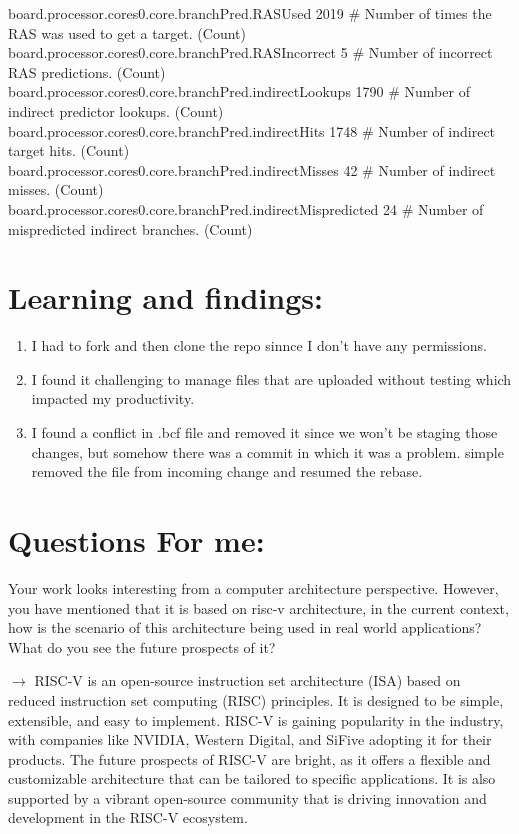 board.processor.cores0.core.branchPred.RASUsed         2019 \# Number of times the RAS was used to get a target. (Count)\\
board.processor.cores0.core.branchPred.RASIncorrect     5 \# Number of incorrect RAS predictions. (Count)\\
board.processor.cores0.core.branchPred.indirectLookups  1790 \# Number of indirect predictor lookups. (Count)\\
board.processor.cores0.core.branchPred.indirectHits     1748 \# Number of indirect target hits. (Count)\\
board.processor.cores0.core.branchPred.indirectMisses    42 \# Number of indirect misses. (Count)\\
board.processor.cores0.core.branchPred.indirectMispredicted  24 \# Number of mispredicted indirect branches. (Count)\\
\section{Learning and findings: }
\begin{enumerate}
    \item I had to fork and then clone the repo sinnce I don't have any permissions.
    \item I found it challenging to manage files that are uploaded without testing which impacted my productivity. 
    \item I found a conflict in .bcf file and removed it since we won't be staging those changes, but somehow there was a commit in which it was a problem. simple removed the file from incoming change and resumed the rebase.
\end{enumerate}
\section*{Questions For me: }
Your work looks interesting from a computer architecture perspective. However, you have mentioned that it is based on risc-v architecture, in the current context, how is the scenario of this architecture being used in real world applications? What do you see the future prospects of it?

$\longrightarrow$ RISC-V is an open-source instruction set architecture (ISA) based on reduced instruction set computing (RISC) principles. 
It is designed to be simple, extensible, and easy to implement. RISC-V is gaining popularity in the industry, with companies like NVIDIA, Western Digital, and SiFive adopting it for their products. 
The future prospects of RISC-V are bright, as it offers a flexible and customizable architecture that can be tailored to specific applications. 
It is also supported by a vibrant open-source community that is driving innovation and development in the RISC-V ecosystem.

